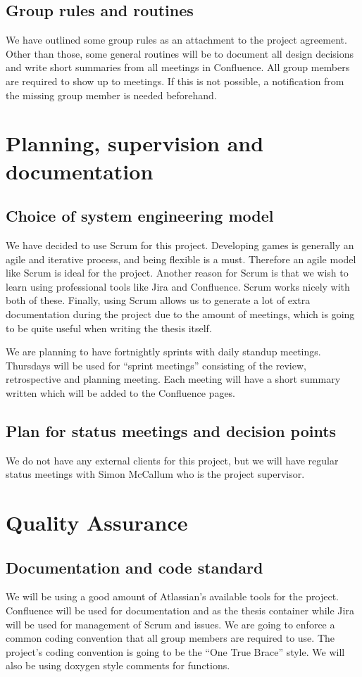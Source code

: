 \subsection*{Group rules and routines}
We have outlined some group rules as an attachment to the project agreement. Other than those, some general routines will be to document all design decisions and write short summaries from all meetings in Confluence. All group members are required to show up to meetings. If this is not possible, a notification from the missing group member is needed beforehand.

\section{Planning, supervision and documentation}
\subsection*{Choice of system engineering model}
We have decided to use Scrum for this project. Developing games is generally an agile and iterative process, and being flexible is a must. Therefore an agile model like Scrum is ideal for the project.  Another reason for Scrum is that we wish to learn using professional tools like Jira and Confluence. Scrum works nicely with both of these. Finally, using Scrum allows us to generate a lot of extra documentation during the project due to the amount of meetings, which is going to be quite useful when writing the thesis itself. 

We are planning to have fortnightly sprints with daily standup meetings. Thursdays will be used for “sprint meetings” consisting of the review, retrospective and planning meeting. Each meeting will have a short summary written which will be added to the Confluence pages. 

\subsection*{Plan for status meetings and decision points}
We do not have any external clients for this project, but we will have regular status meetings with Simon McCallum who is the project supervisor. 

\section{Quality Assurance}
\subsection*{Documentation and code standard}
We will be using a good amount of Atlassian’s available tools for the project. Confluence will be used for documentation and as the thesis container while Jira will be used for management of Scrum and issues. 
We are going to enforce a common coding convention that all group members are required to use. The project’s coding convention is going to be the “One True Brace” style. We will also be using doxygen style comments for functions. 

